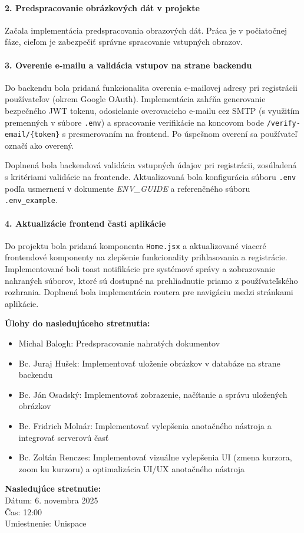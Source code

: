 \paragraph{2. Predspracovanie obrázkových dát v projekte}
Začala implementácia predspracovania obrazových dát. Práca je v počiatočnej fáze, cieľom je zabezpečiť správne spracovanie vstupných obrazov.

\paragraph{3. Overenie e-mailu a validácia vstupov na strane backendu}
Do backendu bola pridaná funkcionalita overenia e-mailovej adresy pri registrácii používateľov (okrem Google OAuth). Implementácia zahŕňa generovanie bezpečného JWT tokenu, odosielanie overovacieho e-mailu cez SMTP (s využitím premenných v súbore \texttt{.env}) a spracovanie verifikácie na koncovom bode \texttt{/verify-email/\{token\}} s presmerovaním na frontend. Po úspešnom overení sa používateľ označí ako overený.

Doplnená bola backendová validácia vstupných údajov pri registrácii, zosúladená s kritériami validácie na frontende. Aktualizovaná bola konfigurácia súboru \texttt{.env} podľa usmernení v dokumente \textit{ENV\_GUIDE} a referenčného súboru \texttt{.env\_example}.

\paragraph{4. Aktualizácie frontend časti aplikácie}
Do projektu bola pridaná komponenta \texttt{Home.jsx} a aktualizované viaceré frontendové komponenty na zlepšenie funkcionality prihlasovania a registrácie. Implementované boli toast notifikácie pre systémové správy a zobrazovanie nahraných súborov, ktoré sú dostupné na prehliadnutie priamo z používateľského rozhrania. Doplnená bola implementácia routera pre navigáciu medzi stránkami aplikácie.

\vspace{0.5cm}
\textbf{Úlohy do nasledujúceho stretnutia:}
\begin{itemize}
    \item Michal Balogh: Predspracovanie nahratých dokumentov
    \item Bc. Juraj Hušek: Implementovať uloženie obrázkov v databáze na strane backendu
    \item Bc. Ján Osadský: Implementovať zobrazenie, načítanie a správu uložených obrázkov
    \item Bc. Fridrich Molnár: Implementovať vylepšenia anotačného nástroja a integrovať serverovú časť
    \item Bc. Zoltán Renczes: Implementovať vizuálne vylepšenia UI (zmena kurzora, zoom ku kurzoru) a optimalizácia UI/UX anotačného nástroja
\end{itemize}

\vspace{0.5cm}
\textbf{Nasledujúce stretnutie:} \\
Dátum: 6. novembra 2025 \\
Čas: 12:00 \\
Umiestnenie: Unispace
